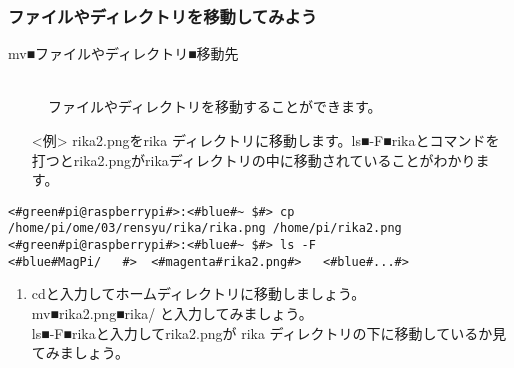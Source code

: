 \subsubsection{ファイルやディレクトリを移動してみよう}
\begin{description}
\item[mv■ファイルやディレクトリ■移動先]\mbox{}\\
ファイルやディレクトリを移動することができます。
\end{description}
\begin{itemize}
\item[<例>]rika2.pngをrika ディレクトリに移動します。ls■-F■rikaとコマンドを打つとrika2.pngがrikaディレクトリの中に移動されていることがわかります。
\end{itemize}
\begin{lstlisting}[caption=mvの例, label=mv]
<#green#pi@raspberrypi#>:<#blue#~ $#> cp /home/pi/ome/03/rensyu/rika/rika.png /home/pi/rika2.png
<#green#pi@raspberrypi#>:<#blue#~ $#> ls -F
<#blue#MagPi/	#>	<#magenta#rika2.png#>	<#blue#...#>
\end{lstlisting}
\begin{tcolorbox}[title=\useOmetoi]
\begin{enumerate}
\item cdと入力してホームディレクトリに移動しましょう。\\ mv■rika2.png■rika/ と入力してみましょう。\\ls■-F■rikaと入力してrika2.pngが rika ディレクトリの下に移動しているか見てみましょう。\\
\end{enumerate}
\end{tcolorbox}

